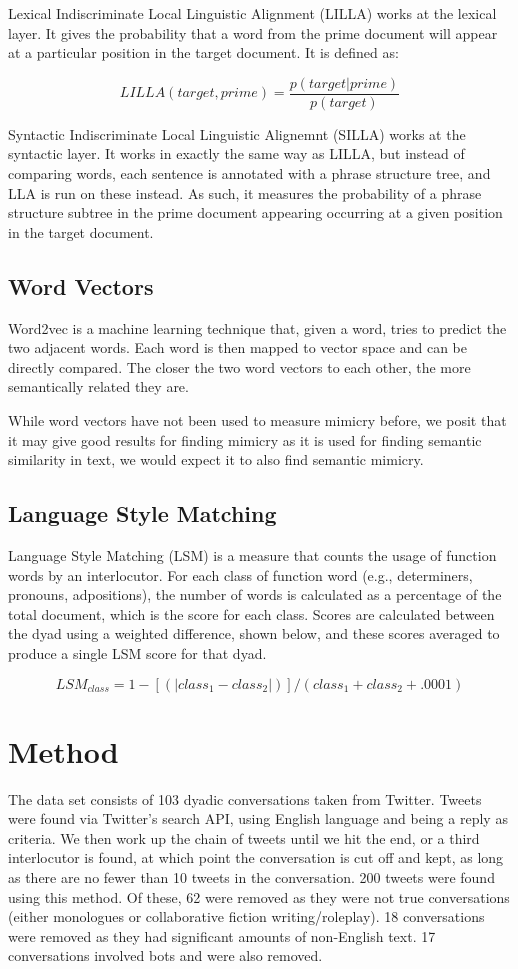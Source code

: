 \documentclass[conference]{IEEEtran}
\begin{document}
Lexical Indiscriminate Local Linguistic Alignment (LILLA) works at the lexical layer. It gives the probability that a word from the prime document will appear at a particular position in the target  document. It is defined as:

\[LILLA(target, prime) = \frac{p(target|prime)}{p(target)}\]

Syntactic Indiscriminate Local Linguistic Alignemnt (SILLA) works at the syntactic layer. It works in exactly the same way as LILLA, but instead of comparing words, each sentence is annotated with a phrase structure tree, and LLA is run on these instead. As such, it measures the probability of a phrase structure subtree in the prime document appearing occurring at a given position in the target document.


\subsection{Word Vectors}
Word2vec \cite{mikolov2013efficient, mikolov2013distributed} is a machine learning technique that, given a word, tries to predict the two adjacent words. Each word is then mapped to vector space and can be directly compared. The closer the two word vectors to each other, the more semantically related they are.

While word vectors have not been used to measure mimicry before, we posit that it may give good results for finding mimicry as it is used for finding semantic similarity in text, we would expect it to also find semantic mimicry.


\subsection{Language Style Matching}
Language Style Matching (LSM) \cite{ireland2010language, ireland2011language} is a measure that counts the usage of function words by an interlocutor. For each class of function word (e.g., determiners, pronouns, adpositions), the number of words is  calculated as a percentage of the total document, which is the score for each class. Scores are calculated between the dyad using a weighted difference, shown below, and these scores averaged to produce a single LSM score for that dyad.

\[ LSM_{class} = 1 - [(|class_1 - class_2|)] / (class_1 + class_2 + .0001) \]


\section{Method}
The data set consists of 103 dyadic conversations taken from Twitter. Tweets were found via Twitter's  search API, using English language and being a reply as criteria. We then work up the chain of tweets  until we hit the end, or a third interlocutor is found, at which point the conversation is cut off and  kept, as long as there are no fewer than 10 tweets in the conversation. 200 tweets were found using  this method. Of these, 62 were removed as they were not true conversations (either monologues or  collaborative fiction writing/roleplay). 18 conversations were removed as they had significant amounts  of non-English text. 17 conversations involved bots and were also removed.
\end{document}

